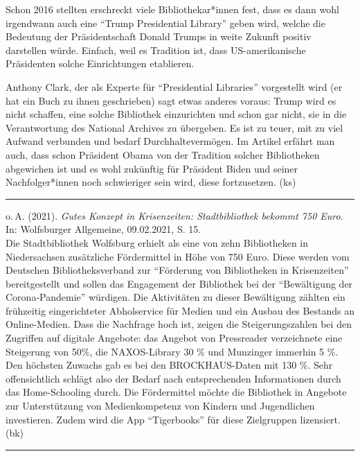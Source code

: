 \documentclass[a4paper,
fontsize=11pt,
oneside,
numbers=noperiodatend,
parskip=half-,
bibliography=totoc,
final
]{scrartcl}
\begin{document}
Schon 2016 stellten erschreckt viele Bibliothekar*innen fest, dass es
dann wohl irgendwann auch eine \enquote{Trump Presidential Library}
geben wird, welche die Bedeutung der Präsidentschaft Donald Trumps in
weite Zukunft positiv darstellen würde. Einfach, weil es Tradition ist,
dass US-amerikanische Präsidenten solche Einrichtungen etablieren.

Anthony Clark, der als Experte für \enquote{Presidential Libraries}
vorgestellt wird (er hat ein Buch zu ihnen geschrieben) sagt etwas
anderes voraus: Trump wird es nicht schaffen, eine solche Bibliothek
einzurichten und schon gar nicht, sie in die Verantwortung des National
Archives zu übergeben. Es ist zu teuer, mit zu viel Aufwand verbunden
und bedarf Durchhaltevermögen. Im Artikel erfährt man auch, dass schon
Präsident Obama von der Tradition solcher Bibliotheken abgewichen ist
und es wohl zukünftig für Präsident Biden und seiner Nachfolger*innen
noch schwieriger sein wird, diese fortzusetzen. (ks)

\begin{center}\rule{0.5\linewidth}{0.5pt}\end{center}

o.\,A. (2021). \emph{Gutes Konzept in Krisenzeiten: Stadtbibliothek
bekommt 750 Euro}. In: Wolfsburger Allgemeine, 09.02.2021, S. 15.\\
Die Stadtbibliothek Wolfsburg erhielt als eine von zehn Bibliotheken in
Niedersachsen zusätzliche Fördermittel in Höhe von 750 Euro. Diese
werden vom Deutschen Bibliotheksverband zur \enquote{Förderung von
Bibliotheken in Krisenzeiten} bereitgestellt und sollen das Engagement
der Bibliothek bei der \enquote{Bewältigung der Corona-Pandemie}
würdigen. Die Aktivitäten zu dieser Bewältigung zählten ein frühzeitig
eingerichteter Abholservice für Medien und ein Ausbau des Bestands an
Online-Medien. Dass die Nachfrage hoch ist, zeigen die Steigerungszahlen
bei den Zugriffen auf digitale Angebote: das Angebot von Pressreader
verzeichnete eine Steigerung von 50\%, die NAXOS-Library 30 \% und
Munzinger immerhin 5 \%. Den höchsten Zuwachs gab es bei den
BROCKHAUS-Daten mit 130 \%. Sehr offensichtlich schlägt also der Bedarf
nach entsprechenden Informationen durch das Home-Schooling durch. Die
Fördermittel möchte die Bibliothek in Angebote zur Unterstützung von
Medienkompetenz von Kindern und Jugendlichen investieren. Zudem wird die
App \enquote{Tigerbooks} für diese Zielgruppen lizensiert. (bk)

\begin{center}\rule{0.5\linewidth}{0.5pt}\end{center}
\end{document}
